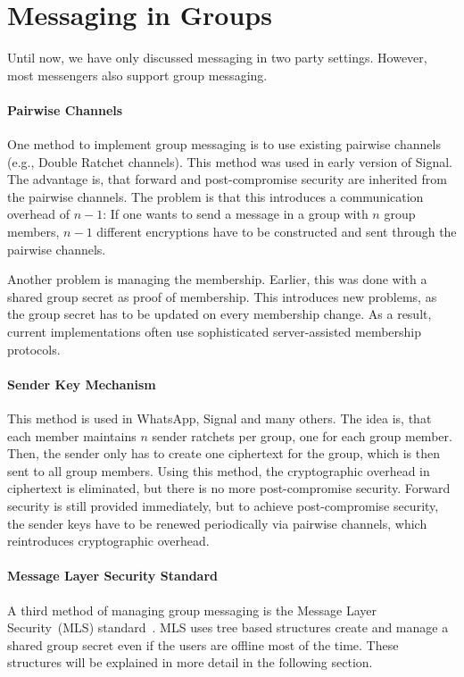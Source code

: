 \section{Messaging in Groups}

Until now, we have only discussed messaging in two party settings.
However, most messengers also support group messaging.

\paragraph{Pairwise Channels} 
One method to implement group messaging is to use existing pairwise channels (e.g., Double Ratchet channels).
This method was used in early version of Signal.
The advantage is, that forward and post-compromise security are inherited from the pairwise channels.
The problem is that this introduces a communication overhead of $n-1$: 
If one wants to send a message in a group with $n$ group members, $n-1$ different encryptions have to be constructed and sent through the pairwise channels.

Another problem is managing the membership. 
Earlier, this was done with a shared group secret as proof of membership.
This introduces new problems, as the group secret has to be updated on every membership change.
As a result, current implementations often use sophisticated server-assisted membership protocols.

\paragraph{Sender Key Mechanism}
This method is used in WhatsApp, Signal and many others.
The idea is, that each member maintains $n$ sender ratchets per group, one for each group member.
Then, the sender only has to create one ciphertext for the group, which is then sent to all group members.
Using this method, the cryptographic overhead in ciphertext is eliminated, but there is no more post-compromise security.
Forward security is still provided immediately, but to achieve post-compromise security, the sender keys have to be renewed periodically via pairwise channels, which reintroduces cryptographic overhead.

\paragraph{Message Layer Security Standard}
A third method of managing group messaging is the Message Layer Security~(MLS) standard~\cite{RFCMLS}.
MLS uses tree based structures create and manage a shared group secret even if the users are offline most of the time.
These structures will be explained in more detail in the following section.


